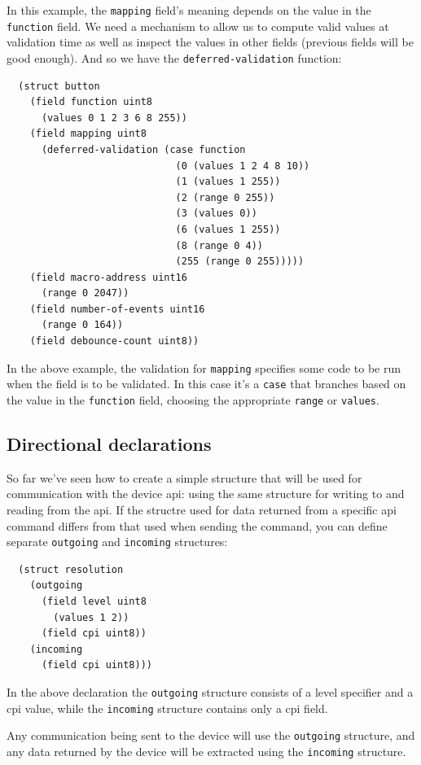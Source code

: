 \documentclass[12pt]{article}
\begin{document}
In this example, the \verb|mapping| field's meaning depends on the
value in the \verb|function| field. We need a mechanism to allow us to
compute valid values at validation time as well as inspect the values
in other fields (previous fields will be good enough). And so we have
the \verb|deferred-validation| function:

\begin{verbatim}
  (struct button
    (field function uint8
      (values 0 1 2 3 6 8 255))
    (field mapping uint8
      (deferred-validation (case function
                             (0 (values 1 2 4 8 10))
                             (1 (values 1 255))
                             (2 (range 0 255))
                             (3 (values 0))
                             (6 (values 1 255))
                             (8 (range 0 4))
                             (255 (range 0 255)))))
    (field macro-address uint16
      (range 0 2047))
    (field number-of-events uint16
      (range 0 164))
    (field debounce-count uint8))
\end{verbatim}

In the above example, the validation for \verb|mapping| specifies some
code to be run when the field is to be validated. In this case it's a
\verb|case| that branches based on the value in the \verb|function| field,
choosing the appropriate \verb|range| or \verb|values|.

\subsection{Directional declarations}

So far we've seen how to create a simple structure that will be used
for communication with the device api: using the same structure for
writing to and reading from the api. If the structre used for data returned from a
specific api command differs from that used when sending the command,
you can define separate \verb|outgoing| and \verb|incoming| structures:

\begin{verbatim}
  (struct resolution
    (outgoing
      (field level uint8
        (values 1 2))
      (field cpi uint8))
    (incoming
      (field cpi uint8)))
\end{verbatim}

In the above declaration the \verb|outgoing| structure consists of a
level specifier and a cpi value, while the \verb|incoming| structure
contains only a cpi field.

Any communication being sent to the device will use the
\verb|outgoing| structure, and any data returned by the device will
be extracted using the \verb|incoming| structure.
\end{document}
